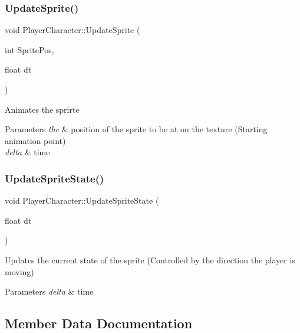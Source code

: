 \subsubsection{\texorpdfstring{Update\+Sprite()}{UpdateSprite()}}
{\footnotesize\ttfamily void Player\+Character\+::\+Update\+Sprite (\begin{DoxyParamCaption}\item[{int}]{Sprite\+Pos,  }\item[{float}]{dt }\end{DoxyParamCaption})\hspace{0.3cm}{\ttfamily [protected]}}

Animates the sprirte


\begin{DoxyParams}{Parameters}
{\em the} & position of the sprite to be at on the texture (Starting animation point) \\
\hline
{\em delta} & time \\
\hline
\end{DoxyParams}
\hypertarget{class_player_character_a9891ba485885beb2516f632a0a252e19}{}\label{class_player_character_a9891ba485885beb2516f632a0a252e19} 
\subsubsection{\texorpdfstring{Update\+Sprite\+State()}{UpdateSpriteState()}}
{\footnotesize\ttfamily void Player\+Character\+::\+Update\+Sprite\+State (\begin{DoxyParamCaption}\item[{float}]{dt }\end{DoxyParamCaption})\hspace{0.3cm}{\ttfamily [protected]}}

Updates the current state of the sprite (Controlled by the direction the player is moving)


\begin{DoxyParams}{Parameters}
{\em delta} & time \\
\hline
\end{DoxyParams}


\subsection{Member Data Documentation}
\hypertarget{class_player_character_accc3a138e2f16b4fd7e07637fa00ef78}{}\label{class_player_character_accc3a138e2f16b4fd7e07637fa00ef78} 
